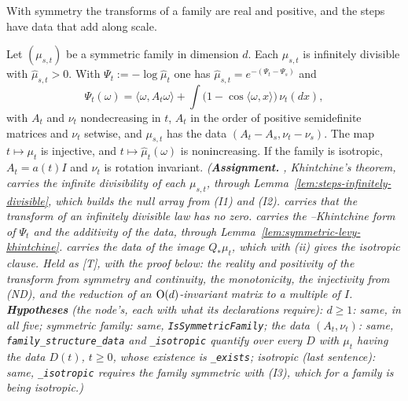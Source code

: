 With symmetry the transforms of a family are real and positive, and the steps have \Levy{} data
that add along scale.

\begin{lemma}[structure]
\label{lem:family-structure}
\leanok
{}
Let $(\mu_{s,t})$ be a symmetric family in dimension $d$. Each $\mu_{s,t}$ is infinitely divisible
with $\widehat\mu_{s,t} > 0$. With $\Psi_t := -\log\widehat\mu_t$ one has
$\widehat\mu_{s,t} = e^{-(\Psi_t - \Psi_s)}$ and
\[
  \Psi_t(\omega) = \langle\omega, A_t\omega\rangle + \int\bigl(1 - \cos\langle\omega, x\rangle\bigr)\,\nu_t(dx),
\]
with $A_t$ and $\nu_t$ nondecreasing in $t$, $A_t$ in the order of positive semidefinite matrices
and $\nu_t$ setwise, and $\mu_{s,t}$ has the data $(A_t - A_s, \nu_t - \nu_s)$.
The map $t \mapsto \mu_t$ is injective, and $t \mapsto \widehat\mu_t(\omega)$ is nonincreasing. If
the family is isotropic, $A_t = a(t)I$ and $\nu_t$ is rotation invariant.
\statusA\quad{}\quad{}\quad{}\quad{}\quad\emph{(\textbf{Assignment.}
, Khintchine's theorem, carries the infinite divisibility of each $\mu_{s,t}$, through
Lemma~\ref{lem:steps-infinitely-divisible}, which builds the null array from (I1) and (I2).
 carries that the transform of an
infinitely divisible law has no zero.  carries the \Levy--Khintchine form of $\Psi_t$
and the additivity of the data, through Lemma~\ref{lem:symmetric-levy-khintchine}.  carries the data of
the image $Q_*\mu_t$, which with (ii) gives the isotropic clause. Held as [T], with the proof below:
the reality and
positivity of the transform from symmetry and continuity, the
monotonicity, the injectivity from (ND), and the reduction of an $\mathrm{O}(d)$-invariant matrix to a
multiple of $I$. \textbf{Hypotheses} (the node's, each with what its declarations require): $d \ge 1$:
same, in all five; symmetric family: same, \texttt{IsSymmetricFamily}; the data $(A_t, \nu_t)$:
same, \texttt{family\_structure\_data} and \texttt{\_isotropic} quantify over every $D$ with
$\mu_t$ having the data $D(t)$, $t \ge 0$, whose existence is \texttt{\_exists}; isotropic (last
sentence): same, \texttt{\_isotropic} requires the family symmetric with (I3), which for a family is
being isotropic.)}
\end{lemma}

